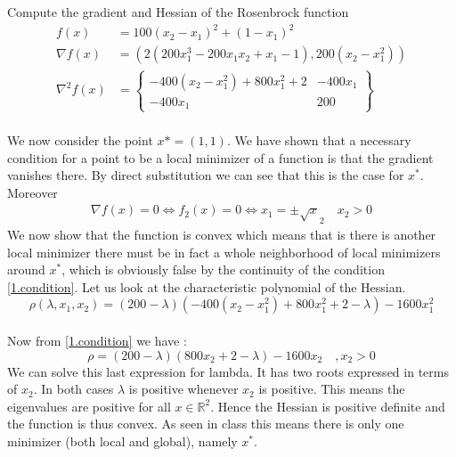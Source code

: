 \documentclass{article}
\begin{document}
		\section{}
		Compute the gradient and Hessian of the Rosenbrock function
		\begin{align*}
			f(x) &= 100(x_2 - x_1)^2 + (1-x_1)^2\\[1ex]
			\nabla f(x) &= (2(200x_1^3 - 200x_1x_2 + x_1 -1),200(x_2 - x_1^2))\\[2ex]
			\nabla ^2 f(x) &= \begin{Bmatrix}
			-400(x_2-x_1^2) + 800x_1^2 +2 & -400x_1\\
			-400x_1 & 200
			\end{Bmatrix}
		\end{align*}\\
		We now consider the point $x* = (1,1)$. We have shown that a necessary condition for a point to be a local minimizer of a function is that the gradient vanishes there. By direct substitution we can see that this is the case for $x^*$. Moreover\\
		\begin{align}\label{1.condition}
			\nabla f(x) = 0 \iff f_2(x) = 0 \iff x_1 = \pm \sqrt x_2  \quad x_2 > 0
		\end{align}
		We now show that the function is convex which means that is there is another local minimizer there must be in fact a whole neighborhood of local minimizers around $x^*$, which is obviously false by the continuity of the condition \ref{1.condition}. Let us look at the characteristic polynomial of the Hessian.\\
		\begin{equation}
			\rho (\lambda,x_1,x_2) = (200 - \lambda) (-400 (x_2-x_1^2) + 800 x_1^2 + 2 - \lambda) - 1600 x_1^2
		\end{equation}\\
		Now from \ref{1.condition} we have :
		\begin{equation}
			\rho = (200 - \lambda) ( 800 x_2 + 2 - \lambda) - 1600 x_2 \quad ,x_2 >0
		\end{equation}
		We can solve this last expression for lambda. It has two roots expressed in terms of $x_2$. In both cases $\lambda$ is positive  whenever $x_2$ is positive. This means the eigenvalues are positive for all $x \in \mathbb R^2$. Hence the Hessian is positive definite and the function is thus convex. As seen in class this means there is only one minimizer (both local and global), namely $x^*$.
		
\end{document}
